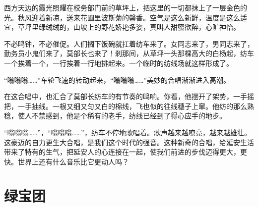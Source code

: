 \documentclass[12pt,UTF-8,openany]{ctexbook}
\begin{document}
\begin{Large}
    西方天边的霞光照耀在校务部门前的草坪上，把这里的一切都抹上了一层金色的光。秋风迎着新凉，送来花圃里波斯菊的馨香。空气是这么新鲜，温度是这么适宜，草坪里绿绒绒的，山坡上的野花娇艳多姿，真叫人甜蜜欲醉，心旷神怡。
    
    不必鸣钟，不必催促。人们搁下饭碗就扛着纺车来了。女同志来了，男同志来了，勤务员小鬼们来了，莫部长也来了！刹那间，从草坪一头那棵高大的白杨起，纺车一个挨着一个，一行挨着一行地排起来。一个临时的纺线场就这样形成了。
    
    “嗡嗡嗡……”车轮飞速的转动起来，“嗡嗡嗡……”美妙的合唱渐渐进入高潮。
    
    在这合唱中，也汇合了莫部长纺车的有节奏的鸣响。你看，他摆开了架势，一手摇把，一手抽线。一根又细又匀又白的棉线，飞也似的往线穗子上窜。他纺的那么熟稔，使人不禁感到，他是个稀有的老手，纺线已经到了得心应手的地步。
    
    “嗡嗡嗡……”，“嗡嗡嗡……”，纺车不停地歌唱着。歌声越来越嘹亮，越来越雄壮。这豪迈的自力更生大合唱，是我们这个时代的强音。这种新奇的合唱，给延安生活带来了特有的生气，把延安人的心连接在一起，使我们前进的步伐迈得更大，更快。世界上还有什么音乐比它更动人吗？
    
\end{Large}

\chapter{绿宝团}
\end{document}
